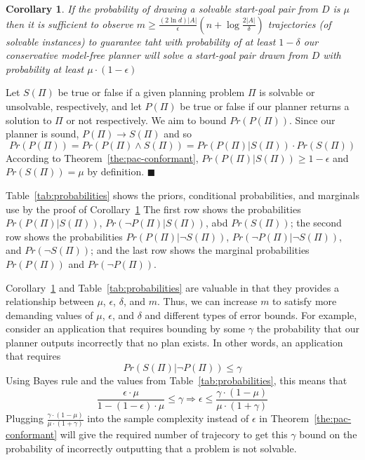 \documentclass{article}
\newtheorem{corollary}{Corollary}
\newenvironment{proof}{\noindent{\bf Proof:~~}}{\qed}
\newcommand{\qed}{\hfill\ensuremath{\blacksquare}}
\newcommand{\solvable}{\textit{S}}
\newcommand{\plannable}{\textit{P}}
\begin{document}
	\begin{corollary}
		If the probability of drawing a solvable start-goal pair from $D$ is $\mu$ then it is sufficient to 
		observe $m\geq\frac{(2\ln  d)|A|}{\epsilon}(n+\log\frac{2|A|}{\delta})$
		trajectories (of solvable instances) to guarantee taht with probability of at least $1-\delta$ our conservative model-free planner will solve a start-goal pair drawn from $D$ with probability at least $\mu\cdot(1-\epsilon)$ 
\label{cor:unsolvable}
	\end{corollary}
\begin{proof}
	Let $\solvable(\Pi)$ be true or false if  a given planning problem $\Pi$ is solvable or unsolvable, respectively, 
	and let $\plannable(\Pi)$ be true or false if our planner returns a solution to $\Pi$ or not respectively. We aim to bound $Pr(\plannable(\Pi))$. Since our planner is sound, $\plannable(\Pi)\rightarrow \solvable(\Pi)$ and so
	\[ Pr(\plannable(\Pi))= Pr(\plannable(\Pi)\wedge \solvable(\Pi))= Pr(\plannable(\Pi)|\solvable(\Pi))\cdot Pr(\solvable(\Pi)) \]
	According to Theorem~\ref{the:pac-conformant}, 
	$Pr(\plannable(\Pi)|\solvable(\Pi))\geq 1-\epsilon$ 
	and $Pr(\solvable(\Pi))=\mu$ by definition. 
\end{proof}

Table~\ref{tab:probabilities} shows the priors, conditional probabilities, and marginals use by the proof of Corollary~\ref{cor:unsolvable}
The first row shows the probabilities 
	$Pr(\plannable(\Pi)|\solvable(\Pi))$, 
	$Pr(\neg\plannable(\Pi)|\solvable(\Pi))$, abd
	$Pr(\solvable(\Pi))$; 
	the second row shows the probabilities 
	$Pr(\plannable(\Pi)|\neg\solvable(\Pi))$, 
	$Pr(\neg\plannable(\Pi)|\neg\solvable(\Pi))$, and
	$Pr(\neg\solvable(\Pi))$;  	
	and the last row shows the marginal probabilities
	$Pr(\plannable(\Pi))$ and  
	$Pr(\neg\plannable(\Pi))$. 
	
	Corollary~\ref{cor:unsolvable} and Table~\ref{tab:probabilities} are valuable in that they provides a relationship between $\mu$, $\epsilon$, $\delta$, and $m$. Thus, we can increase $m$ to satisfy more demanding values of $\mu$, $\epsilon$, and $\delta$ and different types of error bounds. For example, consider an application that requires bounding by some $\gamma$ the probability that our planner outputs incorrectly that no plan exists. In other words, an application that requires 
	\[ Pr(\solvable(\Pi)|\neg\plannable(\Pi))\leq \gamma \]
	Using Bayes rule and the values from Table~\ref{tab:probabilities}, this means that 
	\[ \frac{\epsilon\cdot\mu}{1-(1-\epsilon)\cdot\mu}\leq \gamma \Rightarrow  \epsilon\leq \frac{\gamma\cdot (1-\mu)}{\mu\cdot (1+\gamma)}\]
	\noindent Plugging $\frac{\gamma\cdot (1-\mu)}{\mu\cdot (1+\gamma)}$ into the sample complexity instead of $\epsilon$ in Theorem~\ref{the:pac-conformant} will give the required number of trajecory to get this $\gamma$ bound on the probability of incorrectly outputting that a problem is not solvable. 
	
\end{document}

